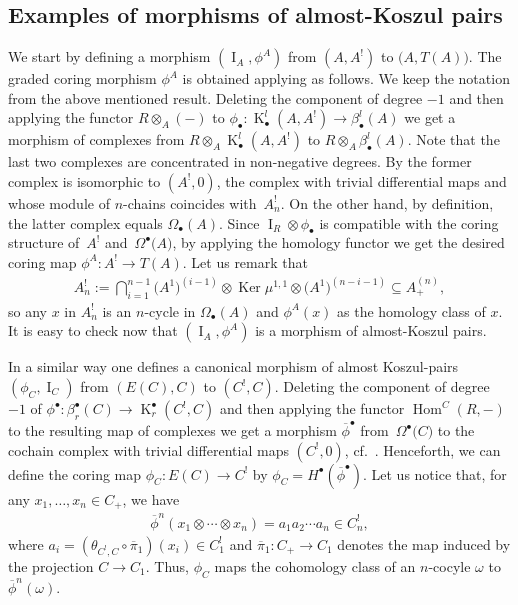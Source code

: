 \documentclass[11pt]{article}
\newcommand{\ol}[1]{\overline{#1}}
\def\Id{\operatorname{I}}
\DeclareMathOperator{\Ker}{Ker}
\DeclareMathOperator{\K}{K}
\newcommand\ot{\otimes}
\newcommand{\Od}[2]{\Omega_{#1}(#2)}
\newcommand{\Ou}[2]{\Omega^{#1}\big(#2\big)}
\renewcommand{\^}[1]{\mbox{$^{\left( #1 \right)}$}}
\renewcommand{\_}[1]{\mbox{$_{\left( #1 \right)}$}}
\newcommand\Hom{\operatorname{Hom}}
\numberwithin{equation}{section}
\begin{document}
\subsection{Examples of morphisms of almost-Koszul pairs}\label{fa:exemples_morphisms}
We start by def\/ining a morphism $(\Id_A,\phi^A)$ from $(A,A^!)$ to $\big(A,T(A)\big)$. The graded coring morphism $\phi^A$ is obtained applying \cite[Proposition 1.24]{jps} as follows. We keep the notation from the above mentioned result. Deleting the component of degree $-1$ and then applying the functor $R\ot_A (-)$ to $\phi _{\bullet}\colon \K_{\bullet}^{l}(A,A^!)\to \beta_{\bullet}^{l}(A)$ we get a morphism of complexes from $R\ot_A \K_{\bullet}^{l}(A,A^!)$ to $R\ot_A \beta_{\bullet}^{l}(A)$. Note that the last two complexes are concentrated in non-negative degrees. By \cite[Proposition 1.23]{jps} the former complex is isomorphic to $(A^!,0)$, the complex with tri\-vial dif\/ferential maps and whose module of $n$-chains coincides with~$A^!_n$. On the other hand, by def\/inition, the latter complex equals $\Od{\bullet}{A}$. Since $\Id_R\ot\phi_\bullet$ is compatible with the coring structure of~$A^!$ and~$\Ou{\bullet}{A}$, by applying the homology functor we get the desired coring map $\phi^A\colon A^!\to T(A)$. Let us remark that
\begin{gather*} A^!_n:=\bigcap_{i=1}^{n-1}\big({A^1}\big)^{(i-1)}\ot\Ker\mu^{1,1}\ot \big({A^1}\big)^{(n-i-1)}\subseteq A_+^{(n)},
\end{gather*}
so any $x$ in $A^!_n$ is an $n$-cycle in $\Od{\bullet}{A}$ and $\phi^A(x)$ as the homology class of $x$. It is easy to check now that $(\Id_A,\phi^A)$ is a morphism of almost-Koszul pairs.

In a similar way one def\/ines a canonical morphism of almost Koszul-pairs $(\phi_C,\Id_C)$ from $(E(C),C)$ to $(C^!,C)$. Deleting the component of degree $-1$ of $\phi ^{\bullet}\colon \beta^\bullet_{r}(C)\to \K^\bullet_{r}(C^!,C)$ and then applying the functor $\Hom^C(R, -)$ to the resulting map of complexes we get a morphism $\ol{\phi}^{\bullet}$ from~$\Ou{\bullet}{C}$ to the cochain complex with trivial dif\/ferential maps $(C^!,0)$, cf.\ \cite[Propositions~1.23 and~1.24]{jps}. Henceforth, we can def\/ine the coring map $\phi_C\colon E(C)\to C^!$ by $\phi_C=H^\bullet(\ol{\phi}^{\bullet})$. Let us notice that, for any $x_1,\dots,x_n\in C_+$, we have
\begin{gather*}
 \ol{\phi}^{n}(x_1\ot\cdots \ot x_n)=a_1a_2\cdots a_n\in C^!_n,
\end{gather*}
where $a_i= (\theta_{C^!,C}\circ\ol{\pi}_1)(x_i)\in C^!_1$ and $\ol{\pi}_1\colon C_+\to C_1$ denotes the map induced by the projection $C\to C_1$. Thus, $\phi_C$ maps the cohomology class of an $n$-cocyle $\omega$ to $ \ol{\phi}^{n}(\omega)$.
\setcounter{section}{3}
\setcounter{subsection}{0}
\setcounter{subsubsection}{0}
\setcounter{Theorem}{5}
\setcounter{equation}{5}
\end{document}
